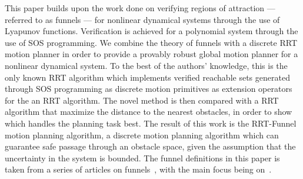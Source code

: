 This paper builds upon the work done on verifying regions of attraction —
referred to as funnels — for nonlinear dynamical systems through the use of
Lyapunov functions. Verification is achieved for a polynomial system through the
use of SOS programming. We combine the theory of funnels with a discrete RRT
motion planner in order to provide a provably robust global motion planner for a
nonlinear dynamical system. To the best of the authors’ knowledge, this is the
only known RRT algorithm which implements verified reachable sets generated
through SOS programming as discrete motion primitives as extension operators for
the an RRT algorithm. The novel method is then compared with a RRT algorithm
that maximize the distance to the nearest obstacles, in order to show which
handles the planning task best. The result of this work is the RRT-Funnel motion
planning algorithm, a discrete motion planning algorithm which can guarantee
safe passage through an obstacle space, given the assumption that the
uncertainty in the system is bounded. The funnel definitions in this paper is
taken from a series of articles on
funnels~\cite{Tobenkin_2011,tedrakeLQRtreesFeedbackMotion2009,
  majumdarRobustOnlineMotion2013,
  majumdarFunnelLibrariesRealtime2017,ahmadi2014dsos}, with the main focus being
on~\cite{majumdarFunnelLibrariesRealtime2017}.
